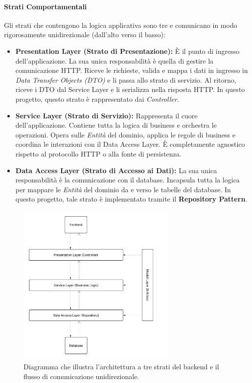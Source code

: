 \documentclass[12pt,a4paper,openright,twoside]{book}
\begin{document}
\paragraph{Strati Comportamentali}
Gli strati che contengono la logica applicativa sono tre e comunicano in modo rigorosamente unidirezionale (dall'alto verso il basso):

\begin{itemize}
    \item \textbf{Presentation Layer (Strato di Presentazione):} È il punto di ingresso dell'applicazione. La sua unica responsabilità è quella di gestire la comunicazione HTTP. Riceve le richieste, valida e mappa i dati in ingresso in \textit{Data Transfer Objects (DTO)} e li passa allo strato di servizio. Al ritorno, riceve i DTO dal Service Layer e li serializza nella risposta HTTP. In questo progetto, questo strato è rappresentato dai \textit{Controller}.

    \item \textbf{Service Layer (Strato di Servizio):} Rappresenta il cuore dell'applicazione. Contiene tutta la logica di business e orchestra le operazioni. Opera sulle \textit{Entità} del dominio, applica le regole di business e coordina le interazioni con il Data Access Layer. È completamente agnostico rispetto al protocollo HTTP o alla fonte di persistenza.

    \item \textbf{Data Access Layer (Strato di Accesso ai Dati):} La sua unica responsabilità è la comunicazione con il database. Incapsula tutta la logica per mappare le \textit{Entità} del dominio da e verso le tabelle del database. In questo progetto, tale strato è implementato tramite il \textbf{Repository Pattern}.
\end{itemize}

\begin{figure}[!htbp]
    \centering
    \includegraphics[width=0.7\textwidth]{figures/layer_design.pdf}
    \caption{Diagramma che illustra l'architettura a tre strati del backend e il flusso di comunicazione unidirezionale.}
    \label{fig:layered_architecture_uml}
\end{figure}
\end{document}

